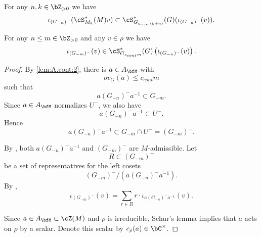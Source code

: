\documentclass[12pt,a4paper]{amsart}%
\newcommand{\RamiA}[1]{{{#1}}}
\begin{document}
\begin{cor}\label{cor:iota.M.gen}  
    For any $n,k\in \Z_{>0}$ we have $$\iota_{(G_{-n})^-}(\cS^*_{M_k}(M)v)\subset \cS^*_{G_{c_{\iota cov}(k+n)}}(G)(\iota_{(G_{-n})^-}(v)).$$
\end{cor}

\begin{lemma}\label{lem:iota.cont}
For any $n\leq m\in \Z_{>0}$ and any $v\in \rho$ we have
$$
\iota_{(G_{-m})^-}(v)
\in
\cS^*_{G_{c_{cont}m}}(G)
\left(\iota_{(G_{-n})^-}(v)\right).
$$
\end{lemma}

\begin{proof}
By \eqref{lem:A.cont:2}, there is $a\in A_\bfM$ with 
\begin{equation}\label{eq:mag.a}
 ov_G(a)\leq c_{cont}m   
\end{equation}
 such that
$$
a\RamiA{(G_{-n})^-}a^{-1}\subset G_{-m}.
$$
Since $a\in A_\bfM$ normalizes $U^-$, we also have
$$
a\RamiA{(G_{-n})^-}a^{-1}\subset U^-.
$$
Hence
$$
a\RamiA{(G_{-n})^-}a^{-1}\subset G_{-m}\cap U^-=\RamiA{(G_{-m})^-}.
$$

By , both $a\RamiA{(G_{-n})^-}a^{-1}$ and $\RamiA{(G_{-m})^-}$ are
$M$-admissible. Let
$$
R\subset \RamiA{(G_{-m})^-}
$$
be a set of representatives for the left cosets
\begin{equation}\label{eq:decomp.a}
\RamiA{(G_{-m})^-}/(a\RamiA{(G_{-n})^-}a^{-1}).
\end{equation}
By ,
$$
\iota_{\RamiA{(G_{-m})^-}}(v)
=
\sum_{r\in R} r\cdot \iota_{a\RamiA{(G_{-n})^-}a^{-1}}(v).
$$

Since $a\in A_\bfM\subset \cZ(M)$ and $\rho$ is irreducible, Schur's lemma
implies that $a$ acts on $\rho$ by a scalar. Denote this scalar by
$c_\rho(a)\in \C^\times$. 

\end{proof}
\end{document}
